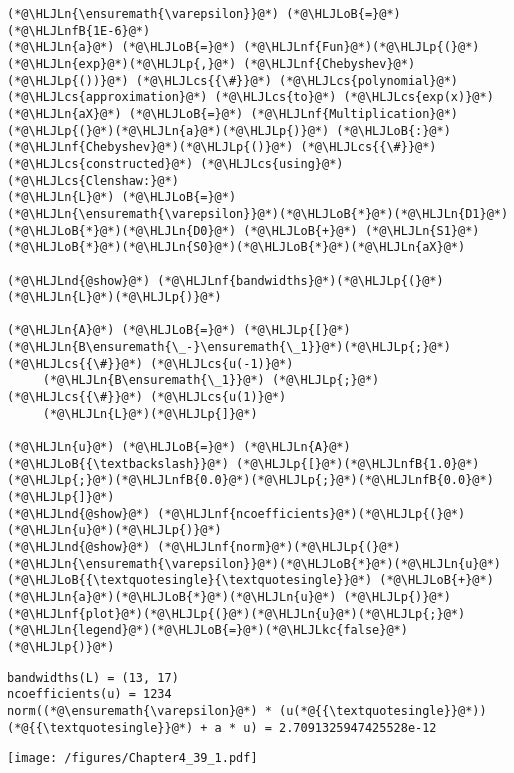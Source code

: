 \documentclass[12pt,a4paper]{article}
\newcommand{\HLJLkc}[1]{\textcolor[RGB]{59,151,46}{\textit{#1}}}
\newcommand{\HLJLn}[1]{#1}
\newcommand{\HLJLnd}[1]{\textcolor[RGB]{214,102,97}{#1}}
\newcommand{\HLJLnf}[1]{\textcolor[RGB]{66,102,213}{#1}}
\newcommand{\HLJLnfB}[1]{\textcolor[RGB]{59,151,46}{#1}}
\newcommand{\HLJLoB}[1]{\textcolor[RGB]{102,102,102}{\textbf{#1}}}
\newcommand{\HLJLp}[1]{#1}
\newcommand{\HLJLcs}[1]{\textcolor[RGB]{153,153,119}{\textit{#1}}}
\begin{document}
\begin{lstlisting}
(*@\HLJLn{\ensuremath{\varepsilon}}@*) (*@\HLJLoB{=}@*) (*@\HLJLnfB{1E-6}@*)
(*@\HLJLn{a}@*) (*@\HLJLoB{=}@*) (*@\HLJLnf{Fun}@*)(*@\HLJLp{(}@*)(*@\HLJLn{exp}@*)(*@\HLJLp{,}@*) (*@\HLJLnf{Chebyshev}@*)(*@\HLJLp{())}@*) (*@\HLJLcs{{\#}}@*) (*@\HLJLcs{polynomial}@*) (*@\HLJLcs{approximation}@*) (*@\HLJLcs{to}@*) (*@\HLJLcs{exp(x)}@*)
(*@\HLJLn{aX}@*) (*@\HLJLoB{=}@*) (*@\HLJLnf{Multiplication}@*)(*@\HLJLp{(}@*)(*@\HLJLn{a}@*)(*@\HLJLp{)}@*) (*@\HLJLoB{:}@*) (*@\HLJLnf{Chebyshev}@*)(*@\HLJLp{()}@*) (*@\HLJLcs{{\#}}@*) (*@\HLJLcs{constructed}@*) (*@\HLJLcs{using}@*) (*@\HLJLcs{Clenshaw:}@*)
(*@\HLJLn{L}@*) (*@\HLJLoB{=}@*) (*@\HLJLn{\ensuremath{\varepsilon}}@*)(*@\HLJLoB{*}@*)(*@\HLJLn{D1}@*)(*@\HLJLoB{*}@*)(*@\HLJLn{D0}@*) (*@\HLJLoB{+}@*) (*@\HLJLn{S1}@*)(*@\HLJLoB{*}@*)(*@\HLJLn{S0}@*)(*@\HLJLoB{*}@*)(*@\HLJLn{aX}@*)

(*@\HLJLnd{@show}@*) (*@\HLJLnf{bandwidths}@*)(*@\HLJLp{(}@*)(*@\HLJLn{L}@*)(*@\HLJLp{)}@*)

(*@\HLJLn{A}@*) (*@\HLJLoB{=}@*) (*@\HLJLp{[}@*)(*@\HLJLn{B\ensuremath{\_-}\ensuremath{\_1}}@*)(*@\HLJLp{;}@*)   (*@\HLJLcs{{\#}}@*) (*@\HLJLcs{u(-1)}@*)
     (*@\HLJLn{B\ensuremath{\_1}}@*) (*@\HLJLp{;}@*)   (*@\HLJLcs{{\#}}@*) (*@\HLJLcs{u(1)}@*)
     (*@\HLJLn{L}@*)(*@\HLJLp{]}@*) 

(*@\HLJLn{u}@*) (*@\HLJLoB{=}@*) (*@\HLJLn{A}@*) (*@\HLJLoB{{\textbackslash}}@*) (*@\HLJLp{[}@*)(*@\HLJLnfB{1.0}@*)(*@\HLJLp{;}@*)(*@\HLJLnfB{0.0}@*)(*@\HLJLp{;}@*)(*@\HLJLnfB{0.0}@*)(*@\HLJLp{]}@*)
(*@\HLJLnd{@show}@*) (*@\HLJLnf{ncoefficients}@*)(*@\HLJLp{(}@*)(*@\HLJLn{u}@*)(*@\HLJLp{)}@*)
(*@\HLJLnd{@show}@*) (*@\HLJLnf{norm}@*)(*@\HLJLp{(}@*)(*@\HLJLn{\ensuremath{\varepsilon}}@*)(*@\HLJLoB{*}@*)(*@\HLJLn{u}@*)(*@\HLJLoB{{\textquotesingle}{\textquotesingle}}@*) (*@\HLJLoB{+}@*) (*@\HLJLn{a}@*)(*@\HLJLoB{*}@*)(*@\HLJLn{u}@*) (*@\HLJLp{)}@*)
(*@\HLJLnf{plot}@*)(*@\HLJLp{(}@*)(*@\HLJLn{u}@*)(*@\HLJLp{;}@*) (*@\HLJLn{legend}@*)(*@\HLJLoB{=}@*)(*@\HLJLkc{false}@*)(*@\HLJLp{)}@*)
\end{lstlisting}

\begin{lstlisting}
bandwidths(L) = (13, 17)
ncoefficients(u) = 1234
norm((*@\ensuremath{\varepsilon}@*) * (u(*@{{\textquotesingle}}@*))(*@{{\textquotesingle}}@*) + a * u) = 2.7091325947425528e-12
\end{lstlisting}

\texttt{[image: /figures/Chapter4\_39\_1.pdf]}
\end{document}
